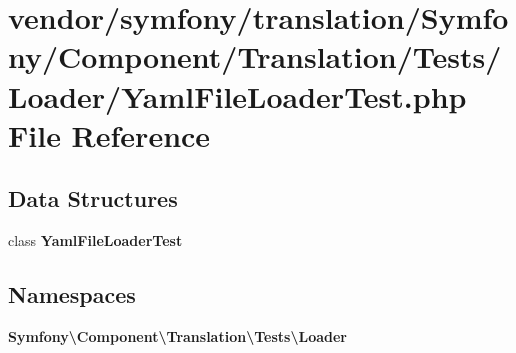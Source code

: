 \section{vendor/symfony/translation/\+Symfony/\+Component/\+Translation/\+Tests/\+Loader/\+Yaml\+File\+Loader\+Test.php File Reference}
\label{translation_2_symfony_2_component_2_translation_2_tests_2_loader_2_yaml_file_loader_test_8php}
\subsection*{Data Structures}
\begin{DoxyCompactItemize}
\item 
class {\bf Yaml\+File\+Loader\+Test}
\end{DoxyCompactItemize}
\subsection*{Namespaces}
\begin{DoxyCompactItemize}
\item 
 {\bf Symfony\textbackslash{}\+Component\textbackslash{}\+Translation\textbackslash{}\+Tests\textbackslash{}\+Loader}
\end{DoxyCompactItemize}
